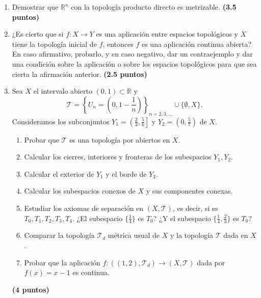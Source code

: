 \begin{enumerate}
    \item Demostrar que $\mathbb{R}^n$ con la topología producto directo es metrizable.
    \hfill \textbf{(3.5 puntos)}

    \item ¿Es cierto que si $f : X \to Y$ es una aplicación entre espacios topológicos y $X$ tiene la topología inicial de $f$, entonces $f$ es una aplicación continua abierta? En caso afirmativo, probarlo, y en caso negativo, dar un contraejemplo y dar una condición sobre la aplicación o sobre los espacios topológicos para que sea cierta la afirmación anterior.
    \hfill \textbf{(2.5 puntos)}

    \item Sea $X$ el intervalo abierto $(0, 1) \subset \mathbb{R}$ y
    \[
        \mathcal{T} = \left\{ U_n = \left(0, 1 - \frac{1}{n}\right) \right\}_{n=2, 3, \dots} \cup \{\emptyset, X\}.
    \]
    Consideramos los subconjuntos $Y_1 = \left(\frac{2}{3}, \frac{5}{6}\right]$ y $Y_2 = \left(0, \frac{5}{7}\right)$ de $X$.
    \begin{enumerate}
        \item Probar que $\mathcal{T}$ es una topología por abiertos en $X$.
        \item Calcular los cierres, interiores y fronteras de los subespacios $Y_1, Y_2$.
        \item Calcular el exterior de $Y_1$ y el borde de $Y_2$.
        \item Calcular los subespacios conexos de $X$ y sus componentes conexas.
        \item Estudiar los axiomas de separación en $(X, \mathcal{T})$, es decir, si es $T_0, T_1, T_2, T_3, T_4$. ¿El subespacio $\{\frac{1}{4}\}$ es $T_0$? ¿Y el subespacio $\{\frac{1}{4}, \frac{2}{3}\}$ es $T_0$?
        \item Comparar la topología $\mathcal{T}_d$ métrica usual de $X$ y la topología $\mathcal{T}$ dada en $X$.
        \item Probar que la aplicación $f : ((1, 2), \mathcal{T}_d) \to (X, \mathcal{T})$ dada por $f(x) = x - 1$ es continua.
    \end{enumerate}
    \hfill \textbf{(4 puntos)}
\end{enumerate}
